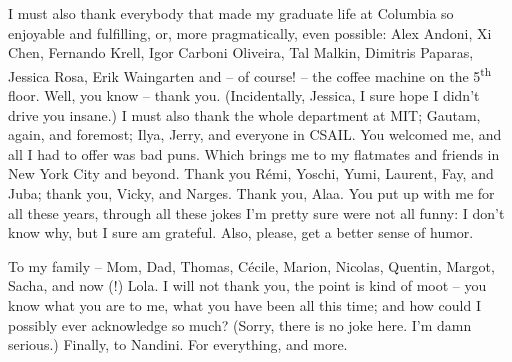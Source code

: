 I must also thank everybody that made my graduate life at Columbia so enjoyable and fulfilling, or, more pragmatically, even possible: Alex Andoni, Xi Chen, Fernando Krell, Igor Carboni Oliveira, Tal Malkin, Dimitris Paparas, Jessica Rosa, Erik Waingarten and -- of course! -- the coffee machine on the 5\textsuperscript{th} floor. Well, you know -- thank you. (Incidentally, Jessica, I sure hope I didn't drive you insane.) I must also thank the whole department at MIT; Gautam, again, and foremost; Ilya, Jerry, and everyone in CSAIL. You welcomed me, and all I had to offer was bad puns. Which brings me to my flatmates and friends in New York City and beyond. Thank you R\'emi, Yoschi, Yumi, Laurent, Fay, and Juba; thank you, Vicky, and Narges. Thank you, Alaa. You put up with me for all these years, through all these jokes I'm pretty sure were not all funny: I don't know why, but I sure am grateful. Also, please, get a better sense of humor.

To my family -- Mom, Dad, Thomas, C\'{e}cile, Marion, Nicolas, Quentin, Margot, Sacha, and now (!) Lola. I will not thank you, the point is kind of moot -- you know what you are to me, what you have been all this time; and how could I possibly ever acknowledge so much? (Sorry, there is no joke here. I'm damn serious.)
Finally, to Nandini. For everything, and more.



%
